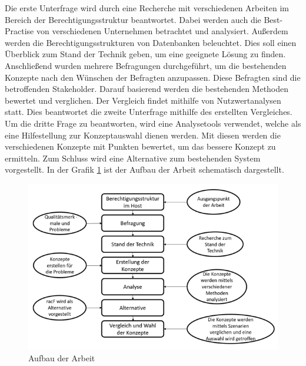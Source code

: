 Die erste Unterfrage wird durch eine Recherche mit verschiedenen Arbeiten im Bereich der Berechtigungsstruktur beantwortet.
Dabei werden auch die Best-Practise von verschiedenen Unternehmen betrachtet und analysiert.
Außerdem werden die Berechtigungsstrukturen von Datenbanken beleuchtet.
Dies soll einen Überblick zum Stand der Technik geben, um eine geeignete Lösung zu finden.
\newline
Anschließend wurden mehrere Befragungen durchgeführt, um die bestehenden Konzepte nach den Wünschen der Befragten anzupassen.
Diese Befragten sind die betroffenden Stakeholder.
Darauf basierend werden die bestehenden Methoden bewertet und verglichen.
Der Vergleich findet mithilfe von Nutzwertanalysen statt.
Dies beantwortet die zweite Unterfrage mithilfe des erstellten Vergleiches.
\newline
Um die dritte Frage zu beantworten, wird eine Analysetools verwendet, welche als eine Hilfestellung zur Konzeptauswahl dienen werden.
Mit diesen werden die verschiedenen Konzepte mit Punkten bewertet, um das bessere Konzept zu ermitteln.
Zum Schluss wird eine Alternative zum bestehenden System vorgestellt.
In der Grafik \ref{fig:vorgehen} ist der Aufbau der Arbeit schematisch dargestellt.
\newpage
\begin{figure}[h!]
\hspace*{-3cm}
 \centering
 \includegraphics[width=1.5\textwidth]{gfx/Picture/Vorgehen.PNG}
 \caption{Aufbau der Arbeit}
 \label{fig:vorgehen}
\end{figure}